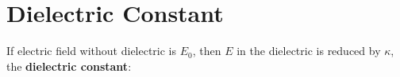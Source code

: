 \section{Dielectric Constant}
If electric field without dielectric is $E_0$, then $E$ in the dielectric is
reduced by $\kappa$, the \textbf{dielectric constant}:
%
%
%
%
%  
%
%
%
%
%
%
%
%
%
%
%
%
%
%
